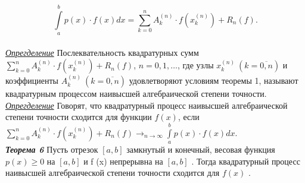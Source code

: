 \documentclass[14pt,a4paper,titlepage]{extarticle}
\begin{document}
\begin{equation}
		\int\limits_a^b p(x)\cdot f(x)dx = \sum_{k = 0}^n A_k^{(n)} \cdot f(x_k^{(n)}) + R_n(f).
		\label{(7)}
	\end{equation}
	\\
\textit{\underline{Опрегделение}}
	Послеквательность квадратурных сумм $\sum_{k = 0}^n A_k^{(n)} \cdot f(x_k^{(n)}) + R_n(f)$, $n = 0, 1, \ldots$, где узлы  $x_k^{(n)} \ (k = \overline{0,n})$ и коэффициенты $A_k^{(n)}  \ (k = \overline{0,n})$ удовлетворяют условиям теоремы 1, называют квадратурным процессом наивысшей алгебраической степени точности.
		\\
\textit{\underline{Опрегделение}}
Говорят, что квадратурный процесс наивысшей алгебраической степени точности сходится для функции $f (x)$, если \\ $\sum_{k = 0}^n A_k^{(n)} \cdot f(x_k^{(n)}) + R_n(f) \rightarrow_{n\rightarrow\infty} \int\limits_a^b p(x)\cdot f(x)dx$.
\\
\textit{{\textbf{Теорема 6}}}
Пусть отрезок $\left[  a, b\right] $ замкнутый и конечный, весовая
функция $p(x) \geqslant 0$ на $\left[  a, b\right] $ и f (x) непрерывна на $\left[  a, b\right] $ . Тогда квадратурный процесс наивысшей алгебраической степени точности сходится для $f (x)$ .	
\end{document}
